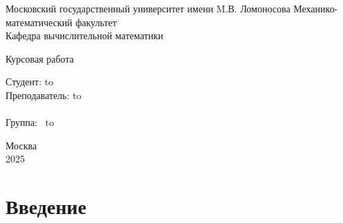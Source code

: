 \documentclass[a4paper,14pt]{extarticle}
\author{Борисенков Никита}
\begin{document}
\begin{titlepage}
    \newpage
    \begin{center}
        Московский государственный университет имени M.В. Ломоносова
        Механико-математический факультет\\
        Кафедра вычислительной математики \\
    \end{center}

    \vspace{8em}

    \begin{center}
        \Large Курсовая работа \\
    \end{center}

    \vspace{2em}

    \begin{center}
        \textsc{\textbf{}}
    \end{center}

    \vspace{20em}



    \newbox{\lbox}
    \newlength{\maxl}
    \setlength{\maxl}{\wd\lbox}
    \hfill\parbox{13cm}{
        \hspace*{5cm}\hspace*{-5cm}Студент: \qquad\qquad\hbox to \\
        \hspace*{5cm}\hspace*{-5cm}Преподаватель: \hbox to \\
        \\
        \hspace*{5cm}\hspace*{-5cm}Группа:\qquad\qquad $\;\:$ \hbox to\\
    }


    \vspace{\fill}

    \begin{center}
        Москва \\2025
    \end{center}

\end{titlepage}
\newpage

\section*{Введение}
\end{document}
